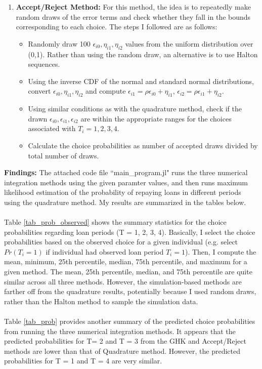\documentclass[12pt]{article}
\begin{document}
\begin{enumerate}
	\item \textbf{Accept/Reject Method: } For this method, the idea is to repeatedly make random draws of the error terms and check whether they fall in the bounds corresponding to each choice. The steps I followed are as follows:
		\begin{itemize}
			\item Randomly draw 100 $\epsilon_{i0}, \eta_{i1}, \eta_{i2}$ values from the uniform distribution over (0,1). Rather than using the random draw, an alternative is to use Halton sequences.
			\item Using the inverse CDF of the normal and standard normal distributions, convert $\epsilon_{i0}, \eta_{i1}, \eta_{i2}$ and compute $\epsilon_{i1} = \rho \epsilon_{i0} + \eta_{i1}$, $\epsilon_{i2} = \rho \epsilon_{i1} + \eta_{i2}$.
			\item Using similar conditions as with the quadrature method, check if the drawn $\epsilon_{i0}, \epsilon_{i1}, \epsilon_{i2}$ are within the appropriate ranges for the choices associated with $T_i = 1, 2, 3, 4$.
			\item Calculate the choice probabilities as number of accepted draws divided by total number of draws.	
		\end{itemize}
	\end{enumerate}

\clearpage 

\noindent \textbf{Findings:} The attached code file ``main\_program.jl" runs the three numerical integration methods using the given paramter values, and then runs maximum likelihood estimation of the probability of repaying loans in different periods using the quadrature method. My results are summarized in the tables below. \\\\
Table \ref{tab_prob_observed} shows the summary statistics for the choice probabilities regarding loan periods (T = 1, 2, 3, 4). Basically, I select the choice probabilities based on the observed choice for a given individual (e.g. select $Pr(T_i = 1)$ if individual had observed loan period $T_i=1$). Then, I compute the mean, minimum, 25th percentile, median, 75th percentile, and maximum for a given method. The mean, 25th percentile, median, and 75th percentile are quite similar across all three methods. However, the simulation-based methods are farther off from the quadrature results, potentially because I used random draws, rather than the Halton method to sample the simulation data. \\\\
Table \ref{tab_prob} provides another summary of the predicted choice probabilities from running the three numerical integration methods. It appears that the predicted probabilities for T= 2 and T = 3 from the GHK and Accept/Reject methods are lower than that of Quadrature method. However, the predicted probabilities for T = 1 and T = 4 are very similar. 
\end{document}
